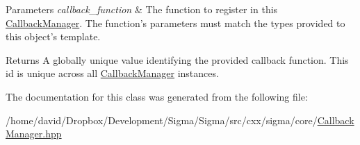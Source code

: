 \begin{DoxyParams}{Parameters}
{\em callback\-\_\-function} & The function to register in this \hyperlink{classsigma_1_1core_1_1_callback_manager}{Callback\-Manager}. The function's parameters must match the types provided to this object's template.\\
\hline
\end{DoxyParams}
\begin{DoxyReturn}{Returns}
A globally unique value identifying the provided callback function. This id is unique across all \hyperlink{classsigma_1_1core_1_1_callback_manager}{Callback\-Manager} instances. 
\end{DoxyReturn}


The documentation for this class was generated from the following file\-:\begin{DoxyCompactItemize}
\item 
/home/david/\-Dropbox/\-Development/\-Sigma/\-Sigma/src/cxx/sigma/core/\hyperlink{_callback_manager_8hpp}{Callback\-Manager.\-hpp}\end{DoxyCompactItemize}
